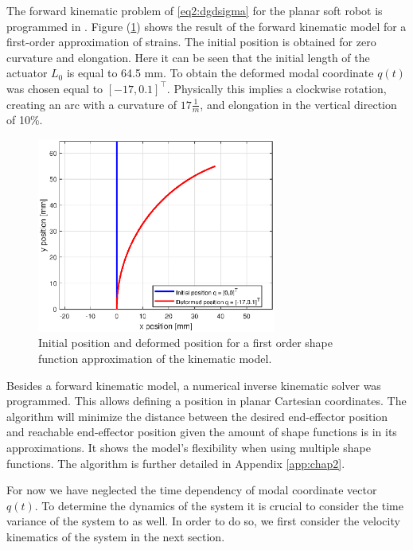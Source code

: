 The forward kinematic problem of \ref{eq2:dgdsigma} for the planar soft robot is programmed in \MATLAB \cite{MATLAB2020}. Figure (\ref{fig1:forward_kinematic}) shows the result of the forward kinematic model for a first-order approximation of strains. The initial position is obtained for zero curvature and elongation. Here it can be seen that the initial length of the actuator $L_0$ is equal to 64.5 mm. To obtain the deformed modal coordinate $q(t)$ was chosen equal to $[-17,0.1]^\top$. Physically this implies a clockwise rotation, creating an arc with a curvature of $17 \frac{1}{m}$, and elongation in the vertical direction of 10\%.


\begin{figure}[H]
    \centering
    \includegraphics[width = 0.7\textwidth]{Figures/Chapter2/fkin1701.eps}
    \caption{Initial position and deformed position for a first order shape function approximation of the kinematic model.}
    \label{fig1:forward_kinematic}
\end{figure}

Besides a forward kinematic model, a numerical inverse kinematic solver was programmed. This allows defining a position in planar Cartesian coordinates. The algorithm will minimize the distance between the desired end-effector position and reachable end-effector position given the amount of shape functions is in its approximations. It shows the model's flexibility when using multiple shape functions. The algorithm is further detailed in Appendix \ref{app:chap2}. 

For now we have neglected the time dependency of modal coordinate vector $q(t)$. To determine the dynamics of the system it is crucial to consider the time variance of the system to as well. In order to do so, we first consider the velocity kinematics of the system in the next section.



